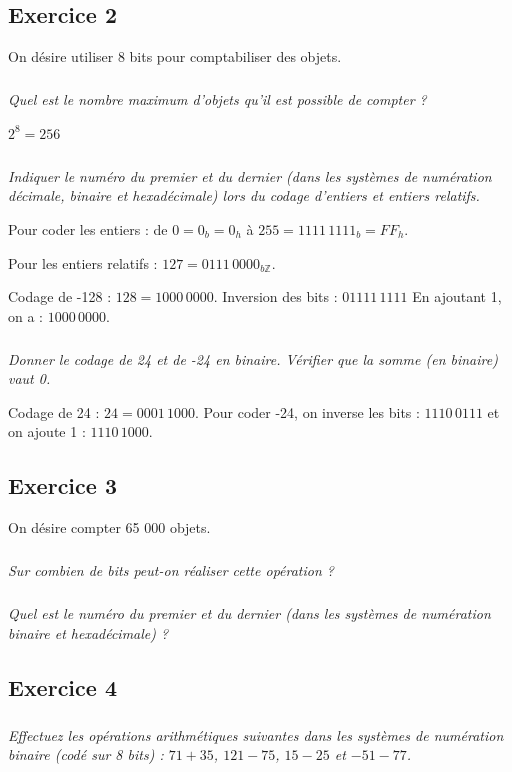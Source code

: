 \documentclass[10pt,fleqn]{article} %
\begin{document}
\begin{multicols}{2}
\subsection*{Exercice 2}
\setcounter{subparagraph}{0}
On désire utiliser 8 bits pour comptabiliser des objets.
\subparagraph{}\textit{Quel est le nombre maximum d’objets qu’il est possible de compter ?}
\ifprof
\begin{corrige}
$2^8  = 256$
\end{corrige}
\else
\fi
\subparagraph{}\textit{Indiquer le numéro du premier et du dernier (dans les systèmes de numération décimale, binaire et hexadécimale) lors du codage d'entiers et entiers relatifs.}
\ifprof
\begin{corrige}
Pour coder les entiers : de $0 = 0_b=0_h$ à $255=1111\,1111_b=FF_h$.

Pour les entiers relatifs : $127=0111\,0000_{b\mathbb{Z}}$.

Codage de -128 : $128=1000\,0000$. Inversion des bits : $01111\,1111$ En ajoutant 1, on a : $1000\,0000$.  

\end{corrige}
\else
\fi
\subparagraph{}\textit{Donner le codage de 24 et de -24 en binaire. Vérifier que la somme (en binaire) vaut 0. }
\ifprof
\begin{corrige}
Codage de 24 : $24=0001\,1000$. Pour coder -24, on inverse les bits : $1110\,0111$ et on ajoute 1 : $1110\,1000$.

\end{corrige}
\else
\fi


\subsection*{Exercice 3}
\setcounter{subparagraph}{0}
On désire compter 65 000 objets.
\subparagraph{}\textit{Sur combien de bits peut-on réaliser cette opération ? }
\subparagraph{}\textit{Quel est le numéro du premier et du dernier (dans les systèmes de numération binaire et hexadécimale) ?}

\subsection*{Exercice 4}
\setcounter{subparagraph}{0}
\subparagraph{}\textit{Effectuez les opérations arithmétiques suivantes dans les systèmes de numération binaire (codé sur 8 bits) : $71+35$, $121-75$, $15-25$ et $- 51 - 77$.}


\end{multicols}
\end{document}
